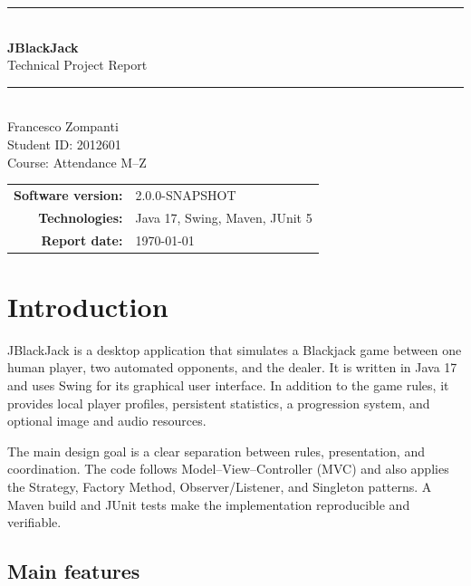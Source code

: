 \documentclass[11pt,a4paper]{report}
\newcommand{\projectversion}{2.0.0-SNAPSHOT}
\begin{document}
\hypersetup{pageanchor=false}
\begin{titlepage}
  \centering
  \vspace*{2.2cm}
  {\color{bjdark}\rule{\textwidth}{1.2pt}}\\[1.1cm]
  {\Huge\bfseries JBlackJack\\[0.35cm]}
  {\LARGE Technical Project Report}
  \\[0.8cm]
  {\color{bjdark}\rule{\textwidth}{1.2pt}}
  \\[2cm]
  {\Large Francesco Zompanti}\\[0.3cm]
  {\large Student ID: 2012601}\\[0.3cm]
  {\large Course: Attendance M--Z}
  \vfill
  \begin{tabular}{rl}
    \textbf{Software version:} & \projectversion \\
    \textbf{Technologies:} & Java 17, Swing, Maven, JUnit 5 \\
    \textbf{Report date:} & \today
  \end{tabular}
  \vspace*{1.4cm}
\end{titlepage}

\hypersetup{pageanchor=true}
\tableofcontents
\clearpage
{}

\chapter{Introduction}

JBlackJack is a desktop application that simulates a Blackjack game between one
human player, two automated opponents, and the dealer. It is written in Java 17 and
uses Swing for its graphical user interface. In addition to the game rules, it provides
local player profiles, persistent statistics, a progression system, and optional image
and audio resources.

The main design goal is a clear separation between rules, presentation, and
coordination. The code follows Model--View--Controller (MVC) and also applies the
Strategy, Factory Method, Observer/Listener, and Singleton patterns. A Maven build and
JUnit tests make the implementation reproducible and verifiable.

\section{Main features}
\end{document}
